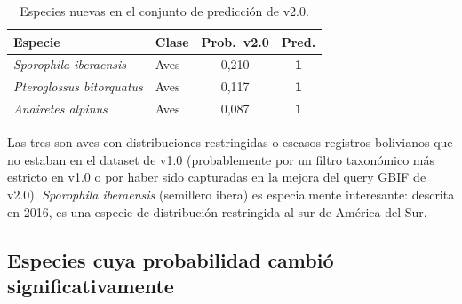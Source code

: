\documentclass[12pt,a4paper]{article}
\begin{document}
\begin{table}[H]
  \centering
  \caption{Especies nuevas en el conjunto de predicción de v2.0.}
  \label{tab:nuevas}
  \begin{tabular}{p{4.8cm}lcc}
    \toprule
    \textbf{Especie} & \textbf{Clase} & \textbf{Prob.\ v2.0} & \textbf{Pred.} \\
    \midrule
    \rowcolor{verdeClaro}\textit{Sporophila iberaensis}   & Aves & 0,210 & \textbf{1} \\
    \rowcolor{verdeClaro}\textit{Pteroglossus bitorquatus}& Aves & 0,117 & \textbf{1} \\
    \rowcolor{verdeClaro}\textit{Anairetes alpinus}       & Aves & 0,087 & \textbf{1} \\
    \bottomrule
  \end{tabular}
\end{table}

Las tres son aves con distribuciones restringidas o escasos registros bolivianos que no
estaban en el dataset de v1.0 (probablemente por un filtro taxonómico más estricto en v1.0
o por haber sido capturadas en la mejora del query GBIF de v2.0).
\textit{Sporophila iberaensis} (semillero ibera) es especialmente interesante: descrita en
2016, es una especie de distribución restringida al sur de América del Sur.

\subsection{Especies cuya probabilidad cambió significativamente}
\end{document}
